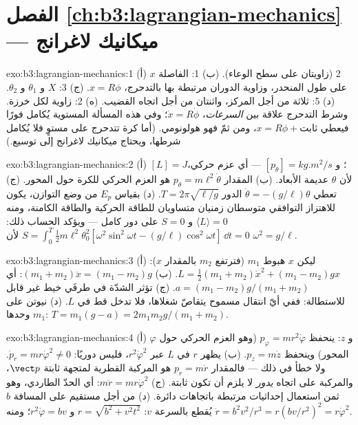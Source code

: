 \section*{الفصل \ref{ch:b3:lagrangian-mechanics} --- ميكانيك لاغرانج}

\begin{solution}{exo:b3:lagrangian-mechanics:1}
(أ) 2 (زاويتان على سطح الوعاء). (ب) 1: الفاصلة $x$ على طول
المنحدر، وزاوية الدوران مرتبطة بها بالتدحرج، $x =
R\phi$. (ج) 3: $X$ و $\theta_1$ و $\theta_2$. (د) 5: ثلاثة من أجل
المركز، واثنتان من أجل اتجاه القضيب. (ه) 2: زاوية لكل خرزة. وشرط
التدحرج علاقة بين \emph{السرعات}، $\dot x =
R\dot\phi$؛ وفي هذه المسألة المستوية يُكامل فورًا فيعطي $x = R\phi +
\text{ثابت}$، ومن ثمّ فهو هولونومي. (أما كرة تتدحرج على مستوٍ فلا
يُكامل شرطها، ويحتاج ميكانيك لاغرانج إلى توسيع.)
\end{solution}

\begin{solution}{exo:b3:lagrangian-mechanics:2}
(أ) $[L] = \unit{J}$؛ و $[p_\theta] = \unit{kg.m^2/s}$ --- أي عزم
حركي، لأن $\theta$ عديمة الأبعاد. (ب) المقدار $p_\theta =
m\ell^2\dot\theta$ هو العزم الحركي للكرة حول المحور.
(ج) تعطي $\ddot\theta = -(g/\ell)\theta$ الدور $T = 2\pi\sqrt{\ell/g}$. (د)
بقياس $E_p$ من وضع التوازن، يكون للاهتزاز التوافقي متوسطان زمنيان
متساويان للطاقة الحركية والطاقة الكامنة، ومنه $\langle
L\rangle = 0$ و $S = 0$ على دور كامل --- ويؤكد الحساب ذلك:
$S = \int_0^T\tfrac12 m\ell^2\theta_0^2[\omega^2\sin^2
\omega t - (g/\ell)\cos^2\omega t]\,\dd t = 0$ لأن $\omega^2 =
g/\ell$.
\end{solution}

\begin{solution}{exo:b3:lagrangian-mechanics:3}
(أ) ليكن $x$ هبوط $m_1$ (فترتفع $m_2$ بالمقدار $x$): $L =
\tfrac12(m_1 + m_2)\dot x^2 + (m_1 - m_2)gx$. (ب) $(m_1 + m_2)\ddot x =
(m_1 - m_2)g$: أي $a = (m_1 - m_2)g/(m_1 + m_2)$. (ج) تؤثر الشدّة في
طرفَي خيط غير قابل للاستطالة: ففي أيّ انتقال مسموح يتقاصّ شغلاها،
فلا تدخل قط في $L$. (د) نيوتن على $m_1$ وحدها: $T =
m_1(g - a) = 2m_1m_2g/(m_1 + m_2)$.
\end{solution}

\begin{solution}{exo:b3:lagrangian-mechanics:4}
(أ) $\varphi$ و $z$: ينحفظ $p_\varphi = mr^2\dot\varphi$ (وهو العزم
الحركي حول المحور) وينحفظ $p_z = m\dot z$. (ب) يظهر $r$ في
$L$ عبر $r^2\dot\varphi^2$، فليس دوريًا: $\dot p_r =
mr\dot\varphi^2 \neq 0$. ولا خطأ في ذلك --- فالمقدار $p_r = m\dot r$ هو
المركبة القطرية لمتجهة ثابتة $\vect p$، والمركبة على اتجاه
\emph{يدور} لا يلزم أن تكون ثابتة. (ج) $m\ddot r =
mr\dot\varphi^2$: أي الحدّ الطاردي، وهو ثمن استعمال إحداثيات
مرتبطة باتجاهات دائرة. (د) من أجل مستقيم على المسافة $b$
يُقطع بالسرعة $v$: $r = \sqrt{b^2 + v^2t^2}$ و $r^2\dot\varphi = bv$؛
ومنه $\ddot r = b^2v^2/r^3 = r(bv/r^2)^2 = r\dot\varphi^2$.
\end{solution}

